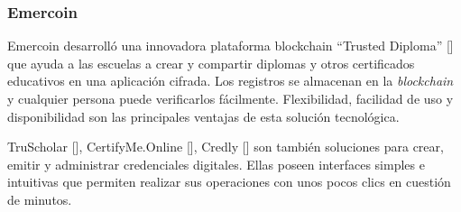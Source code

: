 \subsubsection{Emercoin}
Emercoin desarrolló una innovadora plataforma blockchain ``Trusted Diploma'' [\cite{87}] que ayuda a las escuelas a crear y compartir diplomas y otros certificados educativos en una aplicación cifrada. Los registros se almacenan en la \textit{blockchain} y cualquier persona puede verificarlos fácilmente. Flexibilidad, facilidad de uso y disponibilidad son las principales ventajas de esta solución tecnológica.


%
%
%
%

TruScholar [\cite{86}], CertifyMe.Online [\cite{85}], Credly [\cite{89}] son también soluciones para crear, emitir y administrar credenciales digitales. Ellas poseen interfaces simples e intuitivas que permiten realizar sus operaciones con unos pocos clics en cuestión de minutos.

%

